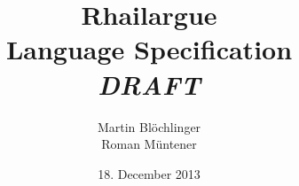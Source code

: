 \title{Rhailargue \\ Language Specification \\ \textit{DRAFT}}
\date{18. December 2013}
\author{Martin Blöchlinger \\ Roman Müntener}
\maketitle
\thispagestyle{empty}
\newpage
